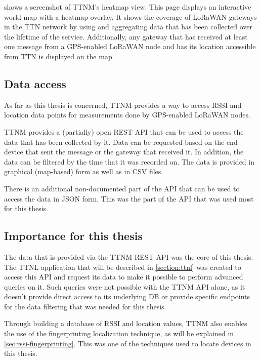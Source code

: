  shows a screenshot of \acl{TTNM}'s heatmap view.
This page displays an interactive world map with a heatmap overlay.
It shows the coverage of \ac{LoRaWAN} gateways in the \ac{TTN} network by using and aggregating data that has been collected over the lifetime of the service.
Additionally, any gateway that has received at least one message from a \ac{GPS}-enabled \ac{LoRaWAN} node and has its location accessible from \ac{TTN} is displayed on the map.

\subsection{Data access}

As far as this thesis is concerned, \acl{TTNM} provides a way to access \ac{RSSI} and location data points for measurements done by \ac{GPS}-enabled \ac{LoRaWAN} nodes.

\ac{TTNM} provides a (partially) open \ac{REST} \ac{API} that can be used to access the data that has been collected by it.
Data can be requested based on the end device that sent the message or the gateway that received it.
In addition, the data can be filtered by the time that it was recorded on.
The data is provided in graphical (map-based) form as well as in \ac{CSV} files.

There is an additional non-documented part of the \ac{API} that can be used to access the data in \ac{JSON} form.
This was the part of the \ac{API} that was used most for this thesis.

\subsection{Importance for this thesis}\label{sec:ttn-mapper-importance}

The data that is provided via the \ac{TTNM} \ac{REST} \ac{API} was the core of this thesis.
The \ac{TTNL} application that will be described in \cref{section:ttnl} was created to access this \ac{API} and request its data to make it possible to perform advanced queries on it.
Such queries were not possible with the \ac{TTNM} \ac{API} alone, as it doesn't provide direct access to its underlying \ac{DB} or provide specific endpoints for the data filtering that was needed for this thesis.

Through building a database of \ac{RSSI} and location values, \ac{TTNM} also enables the use of the fingerprinting localization technique, as will be explained in \cref{sec:rssi-fingerprinting}.
This was one of the techniques used to locate devices in this thesis.

